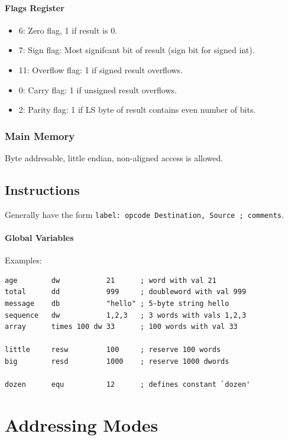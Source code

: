 \documentclass[twocolumn,english]{article}
\begin{document}
\paragraph{Flags Register}
\begin{itemize}
\item 6: Zero flag, 1 if result is 0.
\item 7: Sign flag: Most signifcant bit of result (sign bit for signed int).
\item 11: Overflow flag: 1 if signed result overflows.
\item 0: Carry flag: 1 if unsigned result overflows.
\item 2: Parity flag: 1 if LS byte of result contains even number of bits.
\end{itemize}

\subsubsection{Main Memory}

Byte addresable, little endian, non-aligned access is allowed.


\subsection{Instructions}

Generally have the form \texttt{label: opcode Destination, Source
; comments}.


\paragraph{Global Variables}

Examples:

\noindent 
\begin{lstlisting}[basicstyle={\footnotesize\ttfamily},frame=single]
age        dw           21      ; word with val 21
total      dd           999     ; doubleword with val 999
message    db           "hello" ; 5-byte string hello
sequence   dw           1,2,3   ; 3 words with vals 1,2,3
array      times 100 dw 33      ; 100 words with val 33

little     resw         100     ; reserve 100 words
big        resd         1000    ; reserve 1000 dwords

dozen      equ          12      ; defines constant `dozen'
\end{lstlisting}



\section{Addressing Modes}
\end{document}
